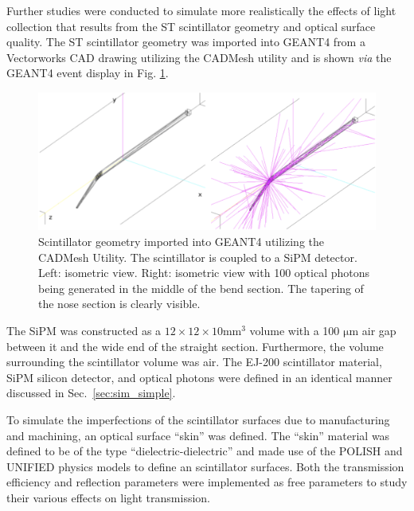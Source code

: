 Further studies were conducted to simulate more realistically the effects of light collection that results from the ST scintillator geometry and optical surface quality.  The ST scintillator geometry was imported into GEANT4 from a Vectorworks CAD drawing utilizing the CADMesh utility \cite{cadmesh_g4} and is shown \textit{via} the GEANT4 event display in Fig. \ref{fig:pk_cadmesh}.
	\begin{figure}[!htb]
	\centering
	\includegraphics[width=1.0\columnwidth]{simulation/figs/pk_cadmesh_v2}
	\caption{Scintillator geometry imported into GEANT4 utilizing the CADMesh Utility.  The scintillator is  coupled to a SiPM detector.  Left: isometric view.  Right: isometric view with 100 optical photons being generated in the middle of the bend section.  The tapering of the nose section is clearly visible.}
	\label{fig:pk_cadmesh}
	\end{figure}
The SiPM was constructed as a $12 \times 12 \times 10 \mathrm{mm^{3}}$ volume with a 100 $\mathrm{\mu m}$ air gap between it and the wide end of the straight section.  Furthermore, the volume surrounding the scintillator volume was air.  The EJ-200 scintillator material, SiPM silicon detector, and optical photons were defined in an identical manner discussed in Sec.~\ref{sec:sim_simple}.

To simulate the imperfections of the scintillator surfaces due to manufacturing and machining, an optical surface ``skin'' was defined.  The ``skin'' material was defined to be of the type ``dielectric-dielectric'' and made use of the POLISH and UNIFIED physics models \cite{scint_surface_sim} to define an scintillator surfaces.  Both the transmission efficiency and reflection parameters were implemented as free parameters to study their various effects on light transmission.

